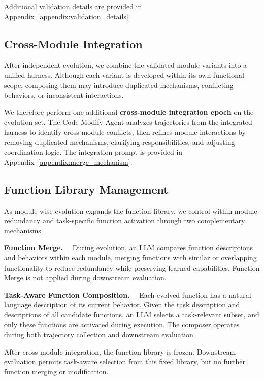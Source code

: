 \documentclass{article} %
\begin{document}
Additional validation details are provided in Appendix~\ref{appendix:validation_details}.


\subsection{Cross-Module Integration}
\label{subsec:cross_module_integration}

After independent evolution, we combine the validated module variants into a unified harness.
Although each variant is developed within its own functional scope, composing them may introduce duplicated mechanisms, conflicting behaviors, or inconsistent interactions.

We therefore perform one additional \textbf{cross-module integration epoch} on the evolution set.
The Code-Modify Agent analyzes trajectories from the integrated harness to identify cross-module conflicts, then refines module interactions by removing duplicated mechanisms, clarifying responsibilities, and adjusting coordination logic.
The integration prompt is provided in Appendix~\ref{appendix:merge_mechanism}.


\subsection{Function Library Management}
\label{subsec:function_composition}

As module-wise evolution expands the function library, we control within-module redundancy and task-specific function activation through two complementary mechanisms.

\noindent\textbf{Function Merge.}~~
During evolution, an LLM compares function descriptions and behaviors within each module, merging functions with similar or overlapping functionality to reduce redundancy while preserving learned capabilities.
Function Merge is not applied during downstream evaluation.

\noindent\textbf{Task-Aware Function Composition.}~~
Each evolved function has a natural-language description of its current behavior.
Given the task description and descriptions of all candidate functions, an LLM selects a task-relevant subset, and only these functions are activated during execution.
The composer operates during both trajectory collection and downstream evaluation.

After cross-module integration, the function library is frozen.
Downstream evaluation permits task-aware selection from this fixed library, but no further function merging or modification.
\end{document}

